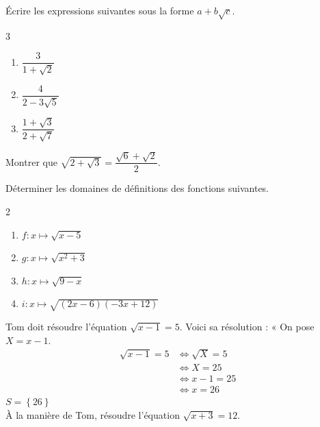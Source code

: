 {\begin{Exercice}
Écrire les expressions suivantes sous la forme $a + b\sqrt{c}$.
\vspace{-0.5cm}
\begin{multicols}{3}
\begin{enumerate}
    \item $\dfrac{3}{1 + \sqrt{2}}$
    \item $\dfrac{4}{2 - 3\sqrt{5}}$
    \item $\dfrac{1 + \sqrt{3}}{2 + \sqrt{7}}$
\end{enumerate}
\end{multicols}
\end{Exercice}

\begin{Exercice}
Montrer que $\sqrt{2 + \sqrt{3}} = \dfrac{\sqrt{6} + \sqrt{2}}{2}$.
\end{Exercice}

\begin{Exercice}
Déterminer les domaines de définitions des fonctions suivantes.
\vspace{-0.5cm}
\begin{multicols}{2}
\begin{enumerate}
    \item $f : x \mapsto \sqrt{x - 5}$
    \item $g : x \mapsto \sqrt{x^2 + 3}$
    \item $h : x \mapsto \sqrt{9 - x}$
    \item $i : x \mapsto \sqrt{(2x - 6)(-3x + 12)}$
\end{enumerate}
\end{multicols}
\end{Exercice}

\newpage

\begin{Exercice}
Tom doit résoudre l'équation $ \sqrt{x-1} = 5 $. Voici sa résolution :
« On pose $ X = x-1 $.
\begin{align*}
 \sqrt{x-1} = 5 &\Leftrightarrow \sqrt{X}=5 \\
 &\Leftrightarrow X=25\\
 &\Leftrightarrow x-1=25\\
 &\Leftrightarrow x=26
 \end{align*}
 $ S=\left\lbrace 26 \right\rbrace  $\\
 
À la manière de Tom, résoudre l'équation $ \sqrt{x+3} = 12 $.
\end{Exercice}

}
